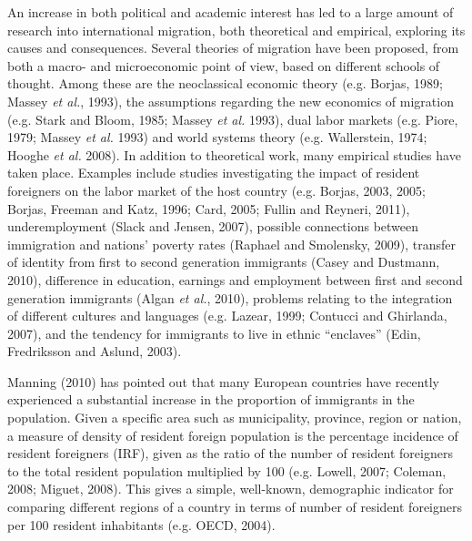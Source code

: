 An increase in both political and academic interest has led to a large amount of research into international migration, both theoretical and empirical, exploring its causes and consequences. Several theories of migration have been proposed, from both a macro- and microeconomic point of view, based on different schools of thought. Among these are the neoclassical economic theory (e.g. Borjas, 1989; Massey \textit{et al.}, 1993), the assumptions regarding the new economics of migration (e.g. Stark and Bloom, 1985; Massey \textit{et al.} 1993), dual labor markets (e.g. Piore, 1979; Massey \textit{et al.} 1993) and world systems theory (e.g. Wallerstein, 1974; Hooghe \textit{et al.} 2008). In addition to theoretical work, many empirical studies have taken place. Examples include studies investigating the impact of resident foreigners on the labor market of the host country (e.g. Borjas, 2003, 2005; Borjas, Freeman and Katz, 1996; Card, 2005; Fullin and Reyneri, 2011), underemployment (Slack and Jensen, 2007), possible connections between immigration and nations' poverty rates (Raphael and Smolensky, 2009), transfer of identity from first to second generation immigrants (Casey and Dustmann, 2010), difference in education, earnings and employment between first and second generation immigrants (Algan \textit{et al.}, 2010), problems relating to the integration of different cultures and languages (e.g. Lazear, 1999; Contucci and Ghirlanda, 2007), and the tendency for immigrants to live in ethnic ``enclaves'' (Edin, Fredriksson and Aslund, 2003). 
  
Manning (2010) has pointed out that many European countries have recently experienced a substantial increase in the proportion of immigrants in the population. Given a specific area such as municipality, province, region or nation, a measure of density of resident foreign population is the percentage incidence of resident foreigners (IRF), given as the ratio of the number of resident foreigners to the total resident population multiplied by 100 (e.g. Lowell, 2007; Coleman, 2008; Miguet, 2008). This gives a simple, well-known, demographic indicator for comparing different regions of a country in terms of number of resident foreigners per 100 resident inhabitants (e.g. OECD, 2004). 

